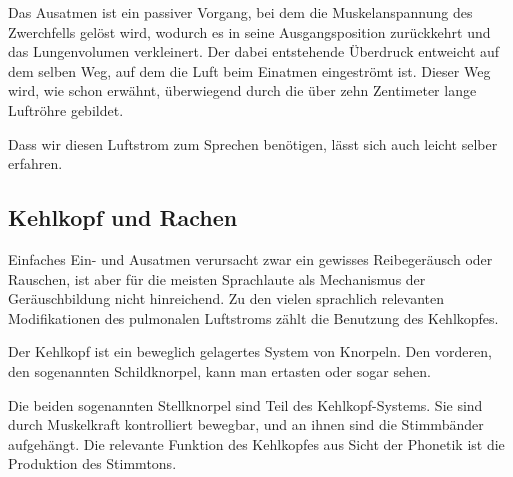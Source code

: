 Das Ausatmen ist ein passiver Vorgang, bei dem die Muskelanspannung des Zwerchfells gelöst wird, wodurch es in seine Ausgangsposition zurückkehrt und das Lungenvolumen verkleinert.
Der dabei entstehende Überdruck entweicht auf dem selben Weg, auf dem die Luft beim Einatmen eingeströmt ist.
Dieser Weg wird, wie schon erwähnt, überwiegend durch die über zehn Zentimeter lange Luftröhre gebildet.


Dass wir diesen Luftstrom zum Sprechen benötigen, lässt sich auch leicht selber erfahren.


\subsection{Kehlkopf und Rachen}

\label{sec:kehlkopf}

Einfaches Ein- und Ausatmen verursacht zwar ein gewisses Reibegeräusch oder Rauschen, ist aber für die meisten Sprachlaute als Mechanismus der Geräuschbildung nicht hinreichend.
Zu den vielen sprachlich relevanten Modifikationen des pulmonalen Luftstroms zählt die Benutzung des Kehlkopfes.

Der Kehlkopf ist ein beweglich gelagertes System von Knorpeln.
Den vorderen, den sogenannten Schildknorpel, kann man ertasten oder sogar sehen.


Die beiden sogenannten Stellknorpel sind Teil des Kehlkopf-Systems.
Sie sind durch Muskelkraft kontrolliert bewegbar, und an ihnen sind die Stimmbänder aufgehängt.
Die relevante Funktion des Kehlkopfes aus Sicht der Phonetik ist die Produktion des Stimmtons.


